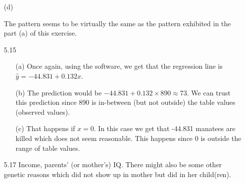 \documentclass[11pt, a4paper]{article}
\begin{document}
\begin{itemize}
\item[(d)]
\item[]
\item[]
\begin{center}
\end{center}
The pattern seems to be virtually the same as the pattern
exhibited in the part (a) of this exercise.
\item[]
\item[]

\newpage

\item[5.15]
\begin{itemize}
\item[(a)]
Once again, using the software, we get that the regression
line is $\hat{y} = -44.831 + 0.132x$.

\item[]

\item[(b)]
The prediction would be $-44.831 + 0.132 \times 890 \approx 73$.
We can trust this prediction since 890 is in-between (but not outside)
the table values (observed values).

\item[]

\item[(c)]
That happens if $x = 0$. In this case we get that
-44.831 manatees are killed which does not seem reasonable.
This happens since 0 is outside the range of table values.
\end{itemize}

\item[]
\item[]

\item[5.17]
Income, parents' (or mother's) IQ. There might also be some other
genetic reasons which did not show up in mother but did in her
child(ren).


\end{itemize}
\end{document}
